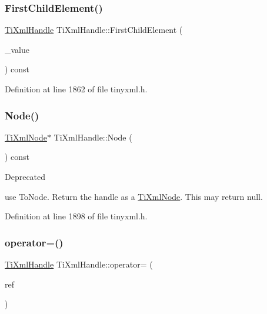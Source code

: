 \subsubsection{\texorpdfstring{First\+Child\+Element()}{FirstChildElement()}\hspace{0.1cm}{\footnotesize\ttfamily [3/3]}}
{\footnotesize\ttfamily \hyperlink{class_ti_xml_handle}{Ti\+Xml\+Handle} Ti\+Xml\+Handle\+::\+First\+Child\+Element (\begin{DoxyParamCaption}\item[{const std\+::string \&}]{\+\_\+value }\end{DoxyParamCaption}) const\hspace{0.3cm}{\ttfamily [inline]}}



Definition at line 1862 of file tinyxml.\+h.

\hypertarget{class_ti_xml_handle_aec0e3ea58ff98a45cd13507a02e2ca1e}{}\label{class_ti_xml_handle_aec0e3ea58ff98a45cd13507a02e2ca1e} 
\subsubsection{\texorpdfstring{Node()}{Node()}}
{\footnotesize\ttfamily \hyperlink{class_ti_xml_node}{Ti\+Xml\+Node}$\ast$ Ti\+Xml\+Handle\+::\+Node (\begin{DoxyParamCaption}{ }\end{DoxyParamCaption}) const\hspace{0.3cm}{\ttfamily [inline]}}

\begin{DoxyRefDesc}{Deprecated}
\item[\hyperlink{deprecated__deprecated000002}{Deprecated}]use To\+Node. Return the handle as a \hyperlink{class_ti_xml_node}{Ti\+Xml\+Node}. This may return null. \end{DoxyRefDesc}


Definition at line 1898 of file tinyxml.\+h.

\hypertarget{class_ti_xml_handle_ad8e5dcf6a87882674203157f29f8e4db}{}\label{class_ti_xml_handle_ad8e5dcf6a87882674203157f29f8e4db} 
\subsubsection{\texorpdfstring{operator=()}{operator=()}}
{\footnotesize\ttfamily \hyperlink{class_ti_xml_handle}{Ti\+Xml\+Handle} Ti\+Xml\+Handle\+::operator= (\begin{DoxyParamCaption}\item[{const \hyperlink{class_ti_xml_handle}{Ti\+Xml\+Handle} \&}]{ref }\end{DoxyParamCaption})\hspace{0.3cm}{\ttfamily [inline]}}



